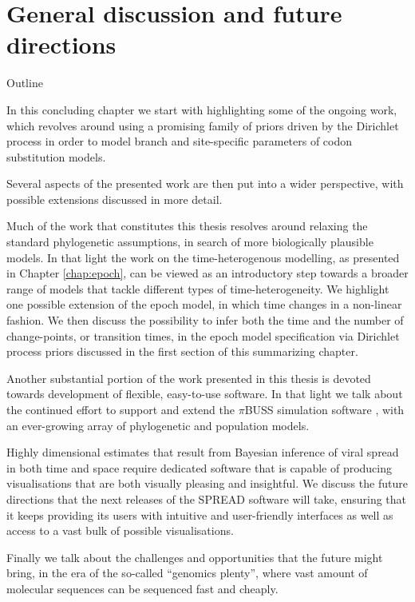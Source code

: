 \chapter{General discussion and future directions}

\begin{remark}{Outline}

In this concluding chapter we start with highlighting some of the ongoing work, which revolves around using a promising family of priors driven by the Dirichlet process in order to model branch and site-specific parameters of codon substitution models.

Several aspects of the presented work are then put into a wider perspective, with possible extensions discussed in more detail. 

Much of the work that constitutes this thesis resolves around relaxing the standard phylogenetic assumptions, in search of more biologically plausible models. 
In that light the work on the time-heterogenous modelling, as presented in Chapter \ref{chap:epoch}, can be viewed as an introductory step towards a broader range of models that tackle different types of time-heterogeneity.
We highlight one possible extension of the epoch model, in which time changes in a non-linear fashion.
We then discuss the possibility to infer both the time and the number of change-points, or transition times, in the epoch model specification via Dirichlet process priors discussed in the first section of this summarizing chapter. 

Another substantial portion of the work presented in this thesis is devoted towards development of flexible, easy-to-use software.
In that light we talk about the continued effort to support and extend the $\pi$BUSS simulation software \citep{Bielejec2014b}, with an ever-growing array of phylogenetic and population models.

Highly dimensional estimates that result from Bayesian inference of viral spread in both time and space require dedicated software that is capable of producing visualisations that are both visually pleasing and insightful.
We discuss the future directions that the next releases of the SPREAD software \citep{Bielejec2011} will take, ensuring that it keeps providing its users with intuitive and user-friendly interfaces as well as access to a vast bulk of possible visualisations.

Finally we talk about the challenges and opportunities that the future might bring, in the era of the so-called ``genomics plenty'', where vast amount of molecular sequences can be sequenced fast and cheaply.
\end{remark}

